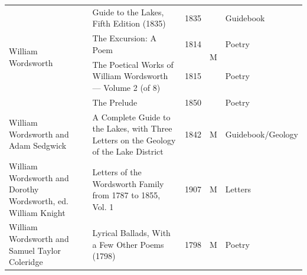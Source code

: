 \begin{longtable}{@{}p{3.2cm} p{5.0cm} c c p{3.2cm}@{}}
\multirow[t]{4}{3.2cm}{William Wordsworth} & Guide to the Lakes, Fifth Edition (1835) & 1835 & \multirow[t]{4}{*}{M} & Guidebook \\
 & The Excursion: A Poem & 1814 &  & Poetry \\
 & The Poetical Works of William Wordsworth — Volume 2 (of 8) & 1815 &  & Poetry \\
 & The Prelude & 1850 &  & Poetry \\
William Wordsworth and Adam Sedgwick & A Complete Guide to the Lakes, with Three Letters on the Geology of the Lake District & 1842 & M & Guidebook/Geology \\
William Wordsworth and Dorothy Wordsworth, ed. William Knight & Letters of the Wordsworth Family from 1787 to 1855, Vol. 1 & 1907 & M & Letters \\
William Wordsworth and Samuel Taylor Coleridge & Lyrical Ballads, With a Few Other Poems (1798) & 1798 & M & Poetry \\
\end{longtable}
